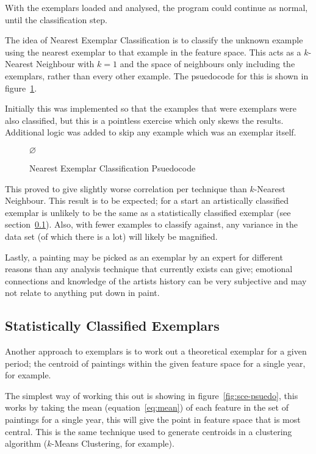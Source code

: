 With the exemplars loaded and analysed, the program could continue as normal, until the
classification step.

The idea of Nearest Exemplar Classification is to classify the unknown example using the nearest
exemplar to that example in the feature space. This acts as a $k$-Nearest Neighbour with $k=1$ and
the space of neighbours only including the exemplars, rather than every other example. The 
psuedocode for this is shown in figure~\ref{fig:nec-psuedo}.

Initially this was implemented so that the examples that were exemplars were also classified, but
this is a pointless exercise which only skews the results. Additional logic was added to skip any
example which was an exemplar itself.

\begin{figure}[h]
\begin{algorithmic}
\State \Return $\varnothing$
\EndIf
\State \Return {}
\EndFunction
\end{algorithmic}
\caption{Nearest Exemplar Classification Psuedocode}\label{fig:nec-psuedo}
\end{figure}

This proved to give slightly worse correlation per technique than $k$-Nearest Neighbour. This 
result is to be expected; for a start an artistically classified exemplar is unlikely to be the
same as a statistically classified exemplar (see section~\ref{sec:sce}). Also, with fewer examples
to classify against, any variance in the data set (of which there is a lot) will likely be 
magnified.

Lastly, a painting may be picked as an exemplar by an expert for different reasons than any
analysis technique that currently exists can give; emotional connections and knowledge of the
artists history can be very subjective and may not relate to anything put down in paint.


\subsection{Statistically Classified Exemplars}\label{sec:sce}

Another approach to exemplars is to work out a theoretical exemplar for a given period; the 
centroid of paintings within the given feature space for a single year, for example.

The simplest way of working this out is showing in figure~\ref{fig:sce-psuedo}, this works by 
taking the mean (equation~\ref{eq:mean}) of each feature in the set of paintings for a single 
year, this will give the point in feature space that is most central. This is the same technique
used to generate centroids in a clustering algorithm ($k$-Means Clustering, for example).

